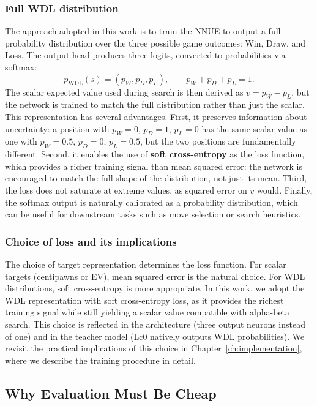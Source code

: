 \subsubsection{Full WDL distribution}\label{sec:wdl}

The approach adopted in this work is to train the NNUE to output a full probability distribution over the three possible game outcomes: Win, Draw, and Loss. The output head produces three logits, converted to probabilities via softmax:
\[
p_{\mathrm{WDL}}(s) = (p_W, p_D, p_L), \qquad p_W + p_D + p_L = 1.
\]
The scalar expected value used during search is then derived as \(v = p_W - p_L\), but the network is trained to match the full distribution rather than just the scalar. This representation has several advantages. First, it preserves information about uncertainty: a position with \(p_W = 0\), \(p_D = 1\), \(p_L = 0\) has the same scalar value as one with \(p_W = 0.5\), \(p_D = 0\), \(p_L = 0.5\), but the two positions are fundamentally different. Second, it enables the use of \textbf{soft cross-entropy} as the loss function, which provides a richer training signal than mean squared error: the network is encouraged to match the full shape of the distribution, not just its mean. Third, the loss does not saturate at extreme values, as squared error on \(v\) would. Finally, the softmax output is naturally calibrated as a probability distribution, which can be useful for downstream tasks such as move selection or search heuristics.

\subsubsection{Choice of loss and its implications}\label{sec:loss-choice}

The choice of target representation determines the loss function. For scalar targets (centipawns or EV), mean squared error is the natural choice. For WDL distributions, soft cross-entropy is more appropriate. In this work, we adopt the WDL representation with soft cross-entropy loss, as it provides the richest training signal while still yielding a scalar value compatible with alpha-beta search. This choice is reflected in the architecture (three output neurons instead of one) and in the teacher model (Lc0 natively outputs WDL probabilities). We revisit the practical implications of this choice in Chapter~\ref{ch:implementation}, where we describe the training procedure in detail.

\subsection{Why Evaluation Must Be Cheap}\label{sec:eval-cheap}

